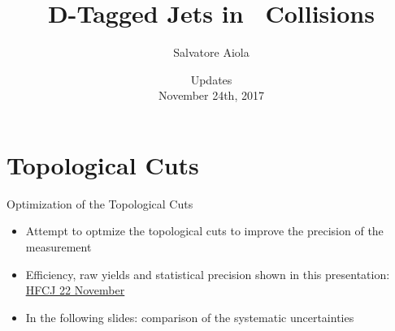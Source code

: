\documentclass[xcolor={usenames,dvipsnames}, aspectratio=169]{beamer}
\title[D-Tagged Jets in \pp] %
{D-Tagged Jets in \pp\ Collisions}
\author[Salvatore Aiola]%
{Salvatore Aiola}
\institute[Yale University] %
{Yale University}
\date[Updates - Nov. 24th, 2017] %
{Updates \\
November 24th, 2017}
\begin{document}
\begin{frame}
  \titlepage
\end{frame}








\section{Topological Cuts}

\begin{frame}{Optimization of the Topological Cuts}
\begin{itemize}
\item Attempt to optmize the topological cuts to improve the precision of the measurement
\item Efficiency, raw yields and statistical precision shown in this presentation: \textcolor{blue}{\underline{\href{https://indico.cern.ch/event/670521/contributions/2800244/attachments/1563677/2463018/DtaggedJets_SAiola.pdf}{HFCJ 22 November}}}
\item In the following slides: comparison of the systematic uncertainties
\end{itemize}
\end{frame}
\end{document}
